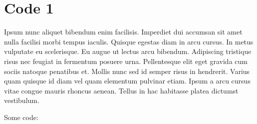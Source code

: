 \section{Code 1}
Ipsum nunc aliquet bibendum enim facilisis. Imperdiet dui accumsan sit amet nulla facilisi morbi tempus iaculis. Quisque egestas diam in arcu cursus. In metus vulputate eu scelerisque. Eu augue ut lectus arcu bibendum. Adipiscing tristique risus nec feugiat in fermentum posuere urna. Pellentesque elit eget gravida cum sociis natoque penatibus et. Mollis nunc sed id semper risus in hendrerit. Varius quam quisque id diam vel quam elementum pulvinar etiam. Ipsum a arcu cursus vitae congue mauris rhoncus aenean. Tellus in hac habitasse platea dictumst vestibulum.

Some code:

\begingroup
\let\clearpage\relax

\endgroup
